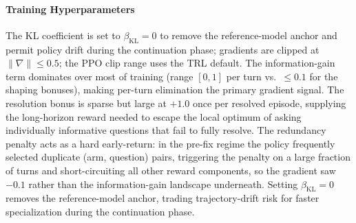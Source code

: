 \documentclass[11pt]{article}
\theoremstyle{plain}
\theoremstyle{definition}
\theoremstyle{remark}
\begin{document}
\paragraph{Training Hyperparameters} The KL coefficient is set to $\beta_{\text{KL}} = 0$ to remove the reference-model anchor and permit policy drift during the continuation phase; gradients are clipped at $\|\nabla\| \le 0.5$; the PPO clip range uses the TRL default. The information-gain term dominates over most of training (range $[0,1]$ per turn vs.\ $\le 0.1$ for the shaping bonuses), making per-turn elimination the primary gradient signal. The resolution bonus is sparse but large at $+1.0$ once per resolved episode, supplying the long-horizon reward needed to escape the local optimum of asking individually informative questions that fail to fully resolve. The redundancy penalty acts as a hard early-return: in the pre-fix regime the policy frequently selected duplicate (arm, question) pairs, triggering the penalty on a large fraction of turns and short-circuiting all other reward components, so the gradient saw $-0.1$ rather than the information-gain landscape underneath. Setting $\beta_{\text{KL}} = 0$ removes the reference-model anchor, trading trajectory-drift risk for faster specialization during the continuation phase. \\
\end{document}
